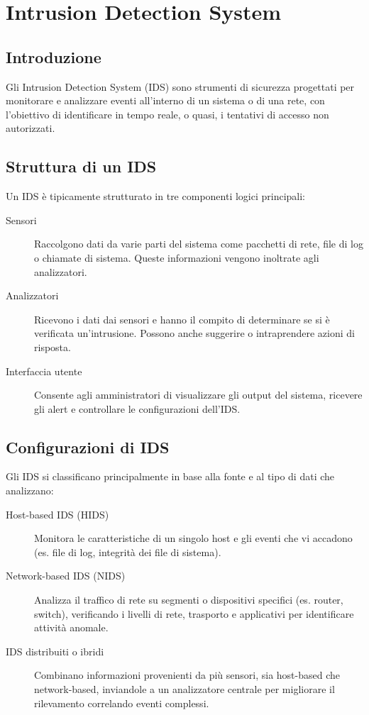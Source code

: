 \chapter{Intrusion Detection System}

\section{Introduzione}

\begin{defbox}
Gli Intrusion Detection System (IDS) sono strumenti di sicurezza progettati per monitorare e analizzare eventi all'interno di un sistema o di una rete, con l'obiettivo di identificare in tempo reale, o quasi, i tentativi di accesso non autorizzati.
\end{defbox}

\section{Struttura di un IDS}
Un IDS è tipicamente strutturato in tre componenti logici principali:
\begin{description}
    \item[Sensori] Raccolgono dati da varie parti del sistema come pacchetti di rete, file di log o chiamate di sistema. Queste informazioni vengono inoltrate agli analizzatori.
    \item[Analizzatori] Ricevono i dati dai sensori e hanno il compito di determinare se si è verificata un'intrusione. Possono anche suggerire o intraprendere azioni di risposta.
    \item[Interfaccia utente] Consente agli amministratori di visualizzare gli output del sistema, ricevere gli alert e controllare le configurazioni dell'IDS.
\end{description}

\section{Configurazioni di IDS}

Gli IDS si classificano principalmente in base alla fonte e al tipo di dati che analizzano:
\begin{description}
    \item[Host-based IDS (HIDS)] Monitora le caratteristiche di un singolo host e gli eventi che vi accadono (es. file di log, integrità dei file di sistema).
    \item[Network-based IDS (NIDS)] Analizza il traffico di rete su segmenti o dispositivi specifici (es. router, switch), verificando i livelli di rete, trasporto e applicativi per identificare attività anomale.
    \item[IDS distribuiti o ibridi] Combinano informazioni provenienti da più sensori, sia host-based che network-based, inviandole a un analizzatore centrale per migliorare il rilevamento correlando eventi complessi.
\end{description}

